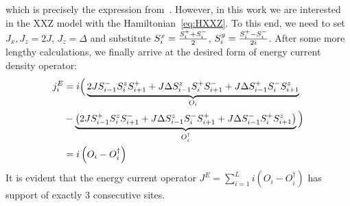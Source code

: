 which is precisely the expression from~\textcite{Zotos1997}. 
However, in this work we are interested in the XXZ model with the Hamiltonian~\eqref{eq:HXXZ}. To this end,
we need to set \(J_x, J_z = 2J\), \(J_z = \Delta \) and substitute \(S^{x}_i = \frac{S^{+}_i + S^{-}_i}{2}\), \(S^{y}_i = \frac{S^{+}_i-S^{-}_i}{2i}\).
After some more lengthy calculations, we finally arrive at the desired form of energy current density operator:
\begin{align}
    j_i^E &= i \Big( \underbrace{2J S^{-}_{i-1}S^{z}_i S^{+}_{i+1} + J \Delta S^{z}_{i-1}S^{+}_i S^{-}_{i+1} + J\Delta S^{+}_{i-1}S^{-}_iS^{z}_{i+1}}_{O_i} \nonumber \\
    &- \underbrace{\left(2J S^{+}_{i-1}S^{z}_i S^{-}_{i+1} + J\Delta S^{z}_{i-1}S^{-}_i S^{+}_{i+1} + J\Delta S^{-}_{i-1}S^{+}_{i} S^{z}_{i+1} \right)}_{O_i^{\dagger}}\Big) \nonumber \\
    &= i\left(O_i - O_i^{\dagger}\right)
    \label{eq:final energy current density}
\end{align}
It is evident that the energy current operator \(J^E = \sum_{i=1}^L i \left(O_i - O_i^{\dagger}\right) \) has support of exactly \(3\) consecutive sites.

